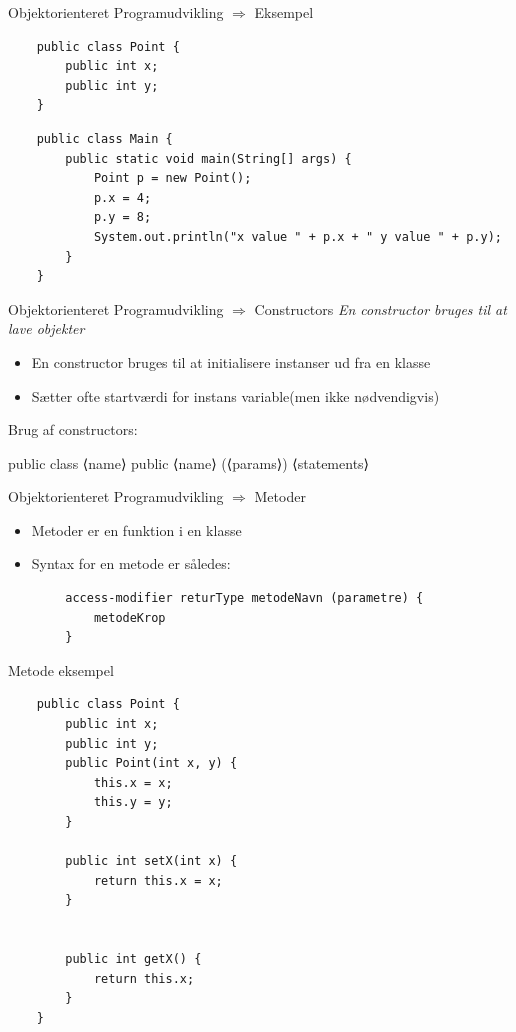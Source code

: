 \documentclass[10pt,aspectratio=1610]{beamer}
\begin{document}
\begin{frame}[fragile]{Objektorienteret Programudvikling $\Rightarrow$ Eksempel}
\begin{lstlisting}
    public class Point {
        public int x;
        public int y;
    }
\end{lstlisting}

\begin{lstlisting}
    public class Main {
        public static void main(String[] args) {
            Point p = new Point();
            p.x = 4;
            p.y = 8;
            System.out.println("x value " + p.x + " y value " + p.y);
        }
    }
\end{lstlisting}
\end{frame}

\begin{frame}{Objektorienteret Programudvikling $\Rightarrow$ Constructors}
    \textit{En constructor bruges til at lave objekter}
    \begin{itemize}
        \item En constructor bruges til at initialisere instanser ud fra en klasse
        \item Sætter ofte startværdi for instans variable(men ikke nødvendigvis)
    \end{itemize}
Brug af constructors:

\begin{center}
    public class ⟨name⟩  {
        public ⟨name⟩ (⟨params⟩) {
            ⟨statements⟩
        }
    }    
\end{center}
\end{frame}

\begin{frame}[fragile]{Objektorienteret Programudvikling $\Rightarrow$ Metoder}
    \begin{itemize}
        \item Metoder er en funktion i en klasse
        \item Syntax for en metode er således:
    \end{itemize}
    \begin{lstlisting}
        access-modifier returType metodeNavn (parametre) {   
            metodeKrop
        }
    \end{lstlisting}
\end{frame}

\begin{frame}[fragile]{Metode eksempel}
\begin{lstlisting}
    public class Point {
        public int x;
        public int y;
        public Point(int x, y) {
            this.x = x;
            this.y = y;
        }

        public int setX(int x) {
            return this.x = x;
        }


        public int getX() {
            return this.x;
        }
    }
\end{lstlisting}
    
\end{frame}
\end{document}
